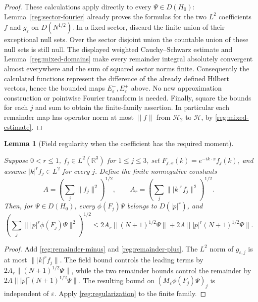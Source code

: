 \documentclass[11pt,a4paper]{article}
\newtheorem{lemma}[theorem]{Lemma}
\theoremstyle{definition}
\theoremstyle{remark}
\newcommand{\proofid}[1]{\par\smallskip{\normalfont\scriptsize\color{inkblue}Stable ID: \nolinkurl{#1}}\par\smallskip}
\begin{document}
\begin{proof}
These calculations apply directly to every $\Psi\in D(H_0)$:
Lemma~\ref{reg:sector-fourier} already proves the formulas for the
two $L^2$ coefficients $f$ and $g_\varepsilon$ on
$D(N^{1/2})$. In a fixed sector, discard the finite union of
their exceptional null sets. Over the sector disjoint union the
countable union of these null sets is still null. The displayed
weighted Cauchy--Schwarz estimate and
Lemma~\ref{reg:mixed-domains} make every remainder integral
absolutely convergent almost everywhere and the sum of squared
sector norms finite. Consequently the calculated functions represent
the difference of the already defined Hilbert vectors, hence the
bounded maps $E^-_\varepsilon,E^+_\varepsilon$ above. No new
approximation construction or pointwise Fourier transform is needed.
Finally, square the bounds for each $j$ and sum to obtain the
finite-family assertion. In particular each remainder map has
operator norm at most $\|f\|$ from $\mathcal H_2$ to
$\mathcal H$, by \eqref{reg:mixed-estimate}.
\end{proof}

\begin{lemma}[Field regularity when the coefficient has the required moment]
\label{reg:regular-field}
\proofid{reg:regular-field}
\par{}\par\smallskip

Suppose \(0<r\leq1\), \(f_j\in L^2(\mathbb R^3)\) for
\(1\leq j\leq3\), set \(F_{j,x}(k)=e^{-ik\cdot x}f_j(k)\), and assume
\(|k|^rf_j\in L^2\) for every \(j\). Define the finite
nonnegative constants
\[
 A=\left(\sum_j\|f_j\|^2\right)^{1/2},\qquad
 A_r=\left(\sum_j\||k|^rf_j\|^2\right)^{1/2}.
\]
Then, for \(\Psi\in D(H_0)\), every \(\phi(F_j)\Psi\) belongs to
\(D(|p|^r)\), and
\begin{equation}
 \left(\sum_j\||p|^r\phi(F_j)\Psi\|^2\right)^{1/2}
 \leq 2A_r\|(N+1)^{1/2}\Psi\|
       +2A\||p|^r(N+1)^{1/2}\Psi\|.
 \label{reg:regular-field-bound}
\end{equation}
\end{lemma}
\begin{proof}
Add \eqref{reg:remainder-minus} and \eqref{reg:remainder-plus}.  The
\(L^2\) norm of \(g_{\varepsilon,j}\) is at most
\(\||k|^rf_j\|\).  The field bound controls the leading terms by
\(2A_r\|(N+1)^{1/2}\Psi\|\), while the two remainder bounds control
the remainder by \(2A\||p|^r(N+1)^{1/2}\Psi\|\).  The resulting
bound on \((M_\varepsilon\phi(F_j)\Psi)_j\) is independent of
\(\varepsilon\).  Apply \ref{reg:regularization} to the finite family.
\end{proof}
\end{document}
